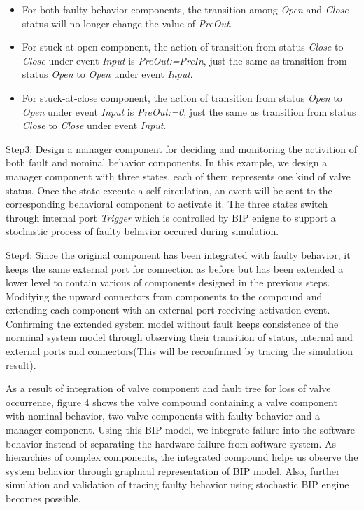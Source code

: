 \begin{itemize}
	\item For both faulty behavior components, the transition among \emph{Open} and \emph{Close} status will no longer change the value of \emph{PreOut}.
	\item For stuck-at-open component, the action of transition from status \emph{Close} to \emph{Close} under event \emph{Input} is \emph{PreOut:=PreIn}, just the same as transition from status \emph{Open} to \emph{Open} under event \emph{Input}.
	\item For stuck-at-close component, the action of transition from status \emph{Open} to \emph{Open} under event \emph{Input} is \emph{PreOut:=0}, just the same as transition from status \emph{Close} to \emph{Close} under event \emph{Input}.
\end{itemize}

Step3: Design a manager component for deciding and monitoring the activition of both fault and nominal behavior components. In this example, we design a manager component with three states, each of them represents one kind of valve status. Once the state execute a self circulation, an event will be sent to the corresponding behavioral component to activate it. The three states switch through internal port \emph{Trigger} which is controlled by BIP enigne to support a stochastic process of faulty behavior occured during simulation.

Step4: Since the original component has been integrated with faulty behavior, it keeps the same external port for connection  as before but has been extended a lower level to contain various of components designed in the previous steps. Modifying the upward connectors from components to the compound and extending each component with an external port receiving activation event. Confirming the extended system model without fault keeps consistence of the norminal system model through observing their transition of status, internal and external ports and connectors(This will be reconfirmed by tracing the simulation result).

As a result of integration of valve component and fault tree for loss of valve occurrence, figure 4 shows the valve compound containing a valve component with nominal behavior, two valve components with faulty behavior and a manager component. Using this BIP model, we integrate failure into the software behavior instead of separating the hardware failure from software system. As hierarchies of complex components, the integrated compound helps us observe the system behavior through graphical representation of BIP model. Also, further simulation and validation of tracing faulty behavior using stochastic BIP engine becomes possible.

